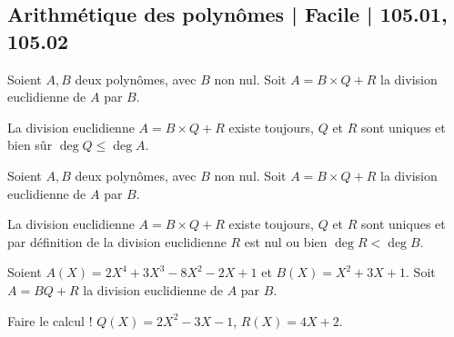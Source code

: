\subsection{Arithmétique des polynômes | Facile | 105.01, 105.02}


\begin{question}
Soient $A,B$ deux polynômes, avec $B$ non nul. 
Soit $A = B \times Q + R$ la division euclidienne de $A$ par $B$. 
\begin{answers}



\end{answers}
\begin{explanations}
La division euclidienne $A = B \times Q + R$ existe toujours, $Q$ et $R$ sont uniques et bien sûr $\deg Q \le \deg A$.
\end{explanations}
\end{question}


\begin{question}
Soient $A,B$ deux polynômes, avec $B$ non nul. 
Soit $A = B \times Q + R$ la division euclidienne de $A$ par $B$.

\begin{answers}



\end{answers}
\begin{explanations}
La division euclidienne $A = B \times Q + R$ existe toujours, $Q$ et $R$ sont uniques et par définition de la division euclidienne $R$ est nul ou bien 
$\deg R < \deg B$.
\end{explanations}
\end{question}


\begin{question}
Soient $A(X) = 2 X^4 + 3 X^3 - 8 X^2 - 2 X + 1$ et $B(X) = X^2+3X+1$. Soit $A = BQ+R$ la division euclidienne de $A$ par $B$.
\begin{answers}



\end{answers}
\begin{explanations}
Faire le calcul !
$Q(X) = 2X^2-3X-1$, $R(X) = 4X+2$.
\end{explanations}
\end{question}




